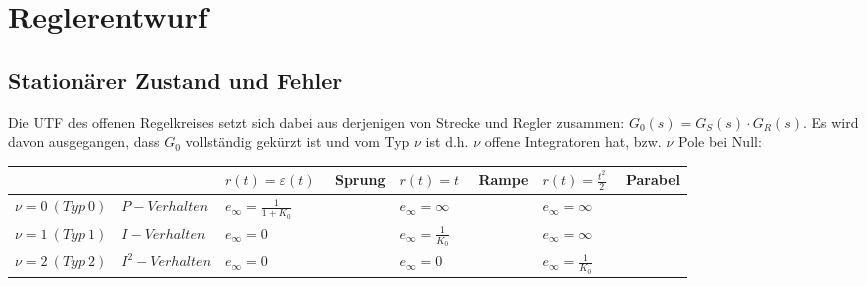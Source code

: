 \section{Reglerentwurf}
\subsection{Stationärer Zustand und Fehler}
Die UTF des offenen Regelkreises setzt sich dabei aus derjenigen von Strecke
und Regler zusammen: $G_0(s) = G_S(s)\cdot G_R(s)$. Es wird davon ausgegangen, dass $G_0$
vollständig gekürzt ist und vom Typ $\nu$ ist d.h. $\nu$ offene Integratoren hat, bzw. $\nu$ Pole
bei Null:
\begin{table}[h!]
	\begin{tabularx}{\textwidth}{|l||X|X|X|}
	\hline
		& $r(t)=\varepsilon(t) \quad $ Sprung & $r(t)=t \quad$ Rampe & $r(t)=\frac{t^2}{2} \quad$ Parabel \\ \hline\hline
		$\nu =0 \ (Typ \ 0) \quad P-Verhalten$ & $e_\infty=\frac{1}{1+K_0}$ & $e_\infty=\infty$ & $e_\infty=\infty$ \\ \hline
		$\nu =1 \ (Typ \ 1) \quad  I-Verhalten$ & $e_\infty=0$ & $e_\infty=\frac{1}{K_0}$ & $e_\infty=\infty$ \\ \hline
		$\nu =2 \ (Typ \ 2) \quad  I^2-Verhalten$ & $e_\infty=0$ & $e_\infty=0$ & $e_\infty=\frac{1}{K_0}$ \\ \hline
	\end{tabularx}
\end{table}
